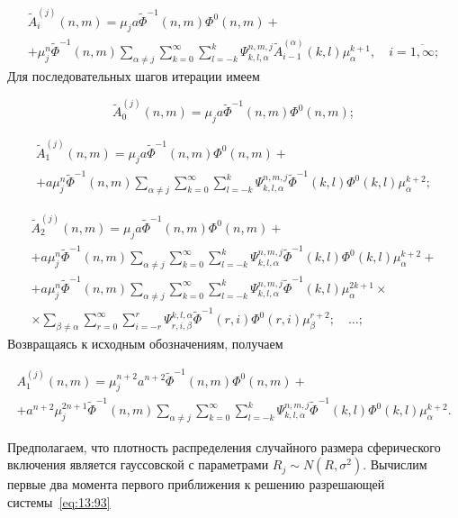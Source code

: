 \begin{multline}
\tilde A_i^{(j)}(n,m)=\mu_j a \tilde \Phi^{-1}(n,m)\Phi^0(n,m)+ \\
+\mu_j^n\tilde \Phi^{-1}(n,m)\sum_{\alpha\neq j}\sum_{k=0}^\infty\sum_{l=-k}^k \Psi_{k,l,\alpha}^{n,m,j}\tilde A_{i-1}^{(\alpha)}(k,l)\mu_\alpha^{k+1},\quad i=\overline{1,\infty};
\label{eq:13:95}
\end{multline}
Для последовательных шагов итерации имеем

\begin{equation}
\tilde A_0^{(j)}(n,m)=\mu_j a \tilde \Phi^{-1}(n,m)\Phi^0(n,m);
\label{eq:13:96}
\end{equation}

\begin{multline}
\tilde A_1^{(j)}(n,m)=\mu_j a \tilde \Phi^{-1}(n,m)\Phi^0(n,m)+ \\
+a\mu_j^n\tilde \Phi^{-1}(n,m)\sum_{\alpha\neq j}\sum_{k=0}^\infty\sum_{l=-k}^k \Psi_{k,l,\alpha}^{n,m,j}\tilde \Phi^{-1}(k,l)\Phi^0(k,l)\mu_\alpha^{k+2};
\label{eq:13:97}
\end{multline}

\begin{multline}
\tilde A_2^{(j)}(n,m)=\mu_j a \tilde \Phi^{-1}(n,m)\Phi^0(n,m)+ \\
+a\mu_j^n\tilde \Phi^{-1}(n,m)\sum_{\alpha\neq j}\sum_{k=0}^\infty\sum_{l=-k}^k \Psi_{k,l,\alpha}^{n,m,j}\tilde \Phi^{-1}(k,l)\Phi^0(k,l)\mu_\alpha^{k+2}+ \\
+a\mu_j^n\tilde \Phi^{-1}(n,m)\sum_{\alpha\neq j}\sum_{k=0}^\infty\sum_{l=-k}^k \Psi_{k,l,\alpha}^{n,m,j}\tilde \Phi^{-1}(k,l)\mu_\alpha^{2k+1}\times \\
\times\sum_{\beta\neq \alpha}\sum_{r=0}^\infty\sum_{i=-r}^r \Psi_{r,i,\beta}^{k,l,\alpha}\tilde \Phi^{-1}(r,i)\Phi^0(r,i)\mu_\beta^{r+2};\quad\dots;
\label{eq:13:98}
\end{multline}
Возвращаясь к исходным обозначениям, получаем

\begin{multline}
A_1^{(j)}(n,m)=\mu_j^{n+2} a^{n+2} \tilde \Phi^{-1}(n,m)\Phi^0(n,m)+ \\
+a^{n+2}\mu_j^{2n+1}\tilde \Phi^{-1}(n,m)\sum_{\alpha\neq j}\sum_{k=0}^\infty\sum_{l=-k}^k \Psi_{k,l,\alpha}^{n,m,j}\tilde \Phi^{-1}(k,l)\Phi^0(k,l)\mu_\alpha^{k+2}.
\label{eq:13:99}
\end{multline}

Предполагаем, что плотность распределения случайного размера сферического включения является гауссовской с параметрами $R_j\sim N(R,\sigma^2)$. Вычислим первые два момента первого приближения к решению разрешающей системы~\eqref{eq:13:93}

